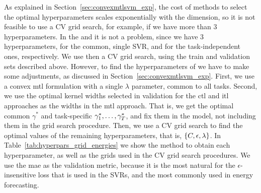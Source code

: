 %
As explained in Section~\ref{sec:convexmtlsvm_exp}, the cost of methods to select the optimal hyperparameters scales exponentially with the dimension, so it is not feasible to use a CV grid search, for example, if we have more than $3$ hyperparameters.
%
In the  and  it is not a problem, since we have $3$ hyperparameters, for the common, single SVR, and for the task-independent ones, respectively. We use then a CV grid search, using the train and validation sets described above.
However, to find the hyperparameters of  we have to make some adjustments, as discussed in Section~\ref{sec:convexmtlsvm_exp}. 
%
First, we use a convex \acrshort{mtl} formulation with a single $\lambda$ parameter, common to all tasks.
%
Second, we use the optimal kernel widths selected in validation for the \acrshort{ctl} and \acrshort{itl} approaches as the widths in the \acrshort{mtl} approach. That is, we get the optimal common $\gamma^*$ and task-specific $\gamma^*_1, \ldots, \gamma^*_T$, and fix them in the  model, not including them in the grid search procedure.
Then, we use a CV grid search to find the optimal values of the remaining hyperparameters, that is, $\left\{C, \epsilon, \lambda\right\}$.
%
In Table~\ref{tab:hyperpars_grid_energies} we show the method to obtain each hyperparameter, as well as the grids used in the CV grid search procedures.
We use the \acrshort{mae} as the validation metric, because it is the most natural for the $\epsilon$-insensitive loss that is used in the SVRs, and the most commonly used in energy forecasting.

